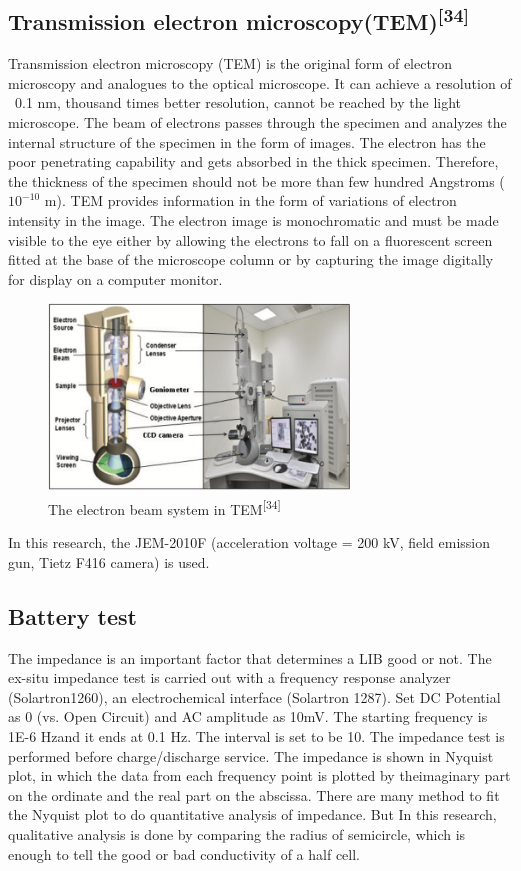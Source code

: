 \subsection{Transmission electron microscopy(TEM)\textsuperscript{[34]}}
Transmission electron microscopy (TEM) is the original form of electron microscopy and analogues to the optical microscope. It can achieve a resolution of ~0.1 nm, thousand times better resolution, cannot be reached by the light microscope. The beam of electrons passes through the specimen and analyzes the internal structure of the specimen in the form of images. The electron has the poor penetrating capability and gets absorbed in the thick specimen. Therefore, the thickness of the specimen should not be more than few hundred Angstroms ($10^{-10}$ m).  TEM provides information in the form of variations of electron intensity in the image. The electron image is monochromatic and must be made visible to the eye either by allowing the electrons to fall on a fluorescent screen fitted at the base of the microscope column or by capturing the image digitally for display on a computer monitor.
\begin{figure}[H]
\centering
\includegraphics[width=8cm]{src/fig/fig30.png}
\caption{The electron beam system in TEM\textsuperscript{[34]}}
\end{figure}
In this research, the JEM-2010F (acceleration voltage = 200 kV, field emission gun, Tietz F416 camera) is used.
\subsection{Battery  test}
The impedance is an important factor that determines a LIB good or not.  The ex-situ impedance test is carried out with a frequency response analyzer (Solartron1260), an electrochemical interface (Solartron 1287). Set DC Potential as 0 (vs. Open Circuit) and AC amplitude as 10mV. The starting frequency is 1E-6 Hzand it ends at 0.1 Hz. The interval is set to be 10.  The impedance test is performed before charge/discharge service. The impedance is shown in Nyquist plot, in which the data from each frequency point is plotted by theimaginary part on the ordinate and the real part on the abscissa. There are many method to fit the Nyquist plot to do quantitative analysis of impedance. But In this research, qualitative analysis is done by comparing the radius of semicircle, which is enough to tell the good or bad conductivity of a half cell.


